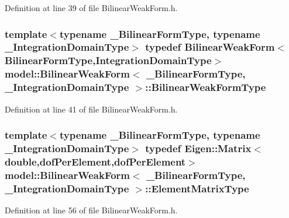 Definition at line 39 of file Bilinear\+Weak\+Form.\+h.

\hypertarget{structmodel_1_1_bilinear_weak_form_aa34216f35460fbae1533245b653038de}{}
\subsubsection[{Bilinear\+Weak\+Form\+Type}]{\setlength{\rightskip}{0pt plus 5cm}template$<$typename \+\_\+\+Bilinear\+Form\+Type, typename \+\_\+\+Integration\+Domain\+Type$>$ typedef {\bf Bilinear\+Weak\+Form}$<${\bf Bilinear\+Form\+Type},{\bf Integration\+Domain\+Type}$>$ {\bf model\+::\+Bilinear\+Weak\+Form}$<$ \+\_\+\+Bilinear\+Form\+Type, \+\_\+\+Integration\+Domain\+Type $>$\+::{\bf Bilinear\+Weak\+Form\+Type}}\label{structmodel_1_1_bilinear_weak_form_aa34216f35460fbae1533245b653038de}


Definition at line 41 of file Bilinear\+Weak\+Form.\+h.

\hypertarget{structmodel_1_1_bilinear_weak_form_a690ee10521b3f2330a0648fab59a2aff}{}
\subsubsection[{Element\+Matrix\+Type}]{\setlength{\rightskip}{0pt plus 5cm}template$<$typename \+\_\+\+Bilinear\+Form\+Type, typename \+\_\+\+Integration\+Domain\+Type$>$ typedef Eigen\+::\+Matrix$<$double,{\bf dof\+Per\+Element},{\bf dof\+Per\+Element}$>$ {\bf model\+::\+Bilinear\+Weak\+Form}$<$ \+\_\+\+Bilinear\+Form\+Type, \+\_\+\+Integration\+Domain\+Type $>$\+::{\bf Element\+Matrix\+Type}}\label{structmodel_1_1_bilinear_weak_form_a690ee10521b3f2330a0648fab59a2aff}


Definition at line 56 of file Bilinear\+Weak\+Form.\+h.

\hypertarget{structmodel_1_1_bilinear_weak_form_a43a6e034f88493f8a1e5af511c16378b}{}
